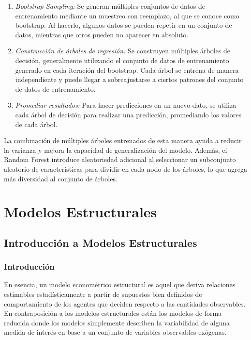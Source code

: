 \documentclass[
]{book}
\begin{document}
\begin{enumerate}
\def\labelenumi{\arabic{enumi}.}
\item
  \emph{Bootstrap Sampling:} Se generan múltiples conjuntos de datos de
  entrenamiento mediante un muestreo con reemplazo, al que se conoce
  como bootstrap. Al hacerlo, algunos datos se pueden repetir en un
  conjunto de datos, mientras que otros pueden no aparecer en
  absoluto.
\item
  \emph{Construcción de árboles de regresión:} Se construyen múltiples
  árboles de decisión, generalmente utilizando el conjunto de datos de
  entrenamiento generado en cada iteración del bootstrap. Cada árbol
  se entrena de manera independiente y puede llegar a sobreajustarse a
  ciertos patrones del conjunto de datos de entrenamiento.
\item
  \emph{Promediar resultados:} Para hacer predicciones en un nuevo dato, se
  utiliza cada árbol de decisión para realizar una predicción,
  promediando los valores de cada árbol.
\end{enumerate}

La combinación de múltiples árboles entrenados de esta manera ayuda a
reducir la varianza y mejora la capacidad de generalización del modelo.
Además, el Random Forest introduce aleatoriedad adicional al seleccionar
un subconjunto aleatorio de características para dividir en cada nodo de
los árboles, lo que agrega más diversidad al conjunto de árboles.

\hypertarget{modelos-estructurales}{%
\chapter{Modelos Estructurales}\label{modelos-estructurales}}

\hypertarget{introducciuxf3n-a-modelos-estructurales}{%
\section{Introducción a Modelos Estructurales}\label{introducciuxf3n-a-modelos-estructurales}}

\hypertarget{introducciuxf3n}{%
\subsection{Introducción}\label{introducciuxf3n}}

En esencia, un modelo econométrico estructural es aquel que deriva relaciones estimables estadísticamente a partir de supuestos bien definidos de comportamiento de los agentes que deciden respecto a las cantidades observables. En contraposición a los modelos estructurales están los modelos de forma reducida donde los modelos simplemente describen la variabilidad de alguna medida de interés en base a un conjunto de variables observables exógenas.
\end{document}
